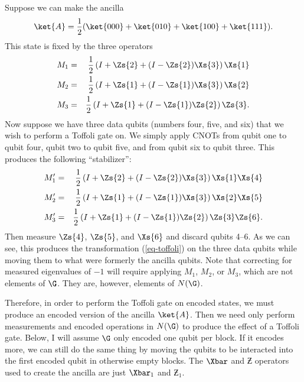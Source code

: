 Suppose we can make the ancilla
\begin{equation}
	\ket{A} = \frac{1}{2} (\ket{000} + \ket{010} + \ket{100} + \ket{111}).
\end{equation}
This state is fixed by the three operators
\begin{eqnarray}
	M_1 & = & \frac{1}{2} \left(I + \Zs{2} + (I - \Zs{2}) \Xs{3} \right) \Xs{1}
	\nonumber \\
	M_2 & = & \frac{1}{2} \left(I + \Zs{1} + (I - \Zs{1}) \Xs{3} \right) \Xs{2}
	\label{eq-Toffoli-ev} \\
	M_3 & = & \frac{1}{2} \left(I + \Zs{1} + (I - \Zs{1}) \Zs{2} \right) \Zs{3}.
	\nonumber
\end{eqnarray}
Now suppose we have three data qubits (numbers four, five, and six) that we
wish to perform a Toffoli gate on.  We simply apply CNOTs from qubit one to
qubit four, qubit two to qubit five, and from qubit six to qubit three.  This
produces the following ``stabilizer'':
\begin{eqnarray}
	M_1' & = & \frac{1}{2} \left(I + \Zs{2} + (I - \Zs{2}) \Xs{3} \right) \Xs{1}
	\Xs{4} \nonumber \\
	M_2' & = & \frac{1}{2} \left(I + \Zs{1} + (I - \Zs{1}) \Xs{3} \right) \Xs{2}
	\Xs{5} \\
	M_3' & = & \frac{1}{2} \left(I + \Zs{1} + (I - \Zs{1}) \Zs{2} \right) \Zs{3}
	\Zs{6}. \nonumber
\end{eqnarray}
Then measure $\Zs{4}$, $\Zs{5}$, and $\Xs{6}$ and discard qubits 4--6.  As we
can see, this produces the transformation (\ref{eq-toffoli}) on the three
data qubits while moving them to what were formerly the ancilla qubits.
Note that correcting for measured eigenvalues of $-1$ will require
applying $M_1$, $M_2$, or $M_3$, which are not elements of $\G$.  They
are, however, elements of $N(\G)$.

Therefore, in order to perform the Toffoli gate on encoded states, we must
produce an encoded version of the ancilla $\ket{A}$.  Then we need only
perform measurements and encoded operations in $N(\G)$ to produce the
effect of a Toffoli gate.  Below, I will assume $\G$ only encoded one qubit
per block.  If it encodes more, we can still do the same thing by moving the
qubits to be interacted into the first encoded qubit in otherwise empty
blocks.  The $\Xbar$ and $\Zbar$ operators used to create the ancilla are
just $\Xbar_1$ and $\Zbar_1$.

